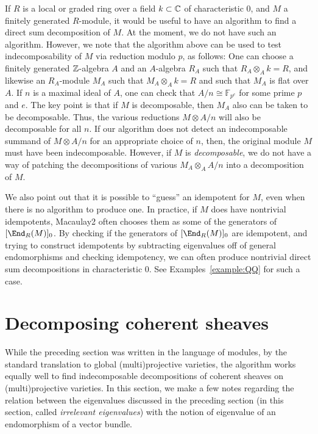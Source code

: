 \documentclass[12pt]{article}
\numberwithin{equation}{section}
\theoremstyle{theorem}
\numberwithin{thm}{section}
\theoremstyle{definition}
\begin{document}
\begin{rem}
If $R$ is a local or graded ring over a field $k\subset \mathbb C$ of characteristic 0, and $M$ a finitely generated $R$-module, it would be useful to have an algorithm to find a direct sum decomposition of $M$.
At the moment, we do not have such an algorithm.
However, we note that the algorithm above can be used to test indecomposability of $M$ via reduction modulo $p$, as follows:
One can choose a finitely generated $\mathbb Z$-algebra $A$ and an $A$-algebra $R_A$ such that $R_A\otimes _A k=R$, and likewise an $R_A$-module $M_A$ such that $M_A\otimes _A k = R$ and such that $M_A$ is flat over $A$. If $n$ is a maximal ideal of $A$, one can check that $A/n \cong \mathbb F_{p^e}$ for some prime $p$ and $e$.
The key point is that if $M$ is decomposable, then $M_A$ also can be taken to be decomposable. Thus, the various reductions  $M\otimes A/n$ will also be decomposable for all $n$.
If our algorithm does not detect an indecomposable summand of $M\otimes A/n$ for an appropriate choice of $n$, then, the original module $M$ must have been indecomposable.
However, if $M$ is \emph{decomposable}, we do not have a way of patching the decompositions of various $M_A\otimes_A A/n$ into a decomposition of $M$.

We also point out that it is possible to ``guess'' an idempotent for $M$, even when there is no algorithm to produce one. In practice, if $M$ does have nontrivial idempotents, Macaulay2 often chooses them as some of the generators of $[\End_R(M)]_0$. By checking if the generators of $[\End_R(M)]_0$ are idempotent, and trying to construct idempotents by subtracting eigenvalues off of general endomorphisms and checking idempotency, we can often produce nontrivial direct sum decompositions in characteristic 0.
See Examples~\ref{example:QQ} for such a case.
\end{rem}


\section{Decomposing coherent sheaves}

While the preceding section was written in the language of modules, by the standard translation to global (multi)projective varieties, the algorithm works equally well to find indecomposable decompositions of coherent sheaves on (multi)projective varieties.
In this section, we make a few notes regarding the relation between the eigenvalues discussed in the preceding section (in this section, called \emph{irrelevant eigenvalues}) with the notion of eigenvalue of an endomorphism of a vector bundle.
\end{document}
